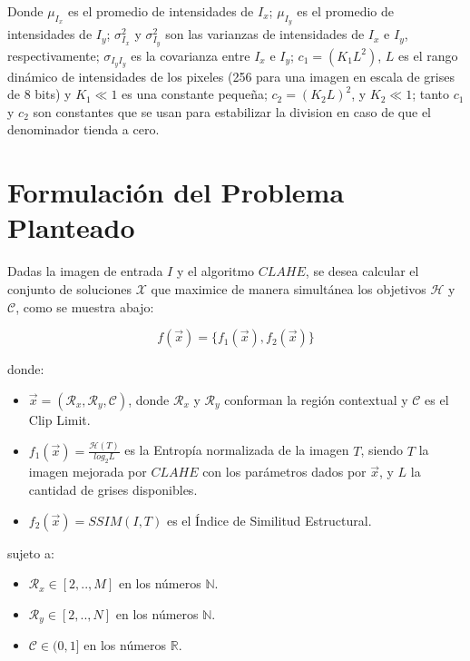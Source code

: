 \documentclass[spanish,twocolumn]{article}
\begin{document}
Donde $\mu_{I_x}$ es el promedio de intensidades de $I_x$; $\mu_{I_y}$ es el promedio de intensidades de $I_y$; $\sigma_{I_x}^2$ y $\sigma_{I_y}^2$ son las varianzas de intensidades de $I_x$ e $I_y$, respectivamente; $\sigma_{I_y I_y}$ es la covarianza entre $I_x$ e $I_y$; $c_1=(K_1L^2)$, $L$ es el rango dinámico de intensidades de los pixeles (256 para una imagen en escala de grises de 8 bits) y $K_1 \ll 1$ es una constante pequeña; $c_2=(K_2 L)^2$, y $K_2 \ll 1$; tanto $c_1$ y $c_2$ son constantes que se usan para estabilizar la division en caso de que el denominador tienda a cero.

\section{Formulación del Problema Planteado}
\label{sec:formulacion}

Dadas la imagen de entrada $I$ y el algoritmo $CLAHE$, se desea calcular el conjunto de soluciones $\mathscr{X}$ que maximice de manera simultánea los objetivos $\mathscr{H}$ y $\mathcal{C}$, como se muestra abajo:

\begin{equation}\label{eq:fitness}
    f(\overrightarrow{x}) = \{ f_1(\overrightarrow{x}), f_2(\overrightarrow{x}) \}
\end{equation}

donde:
\begin{itemize}
\item $\overrightarrow{x}=(\mathcal{R}_x, \mathcal{R}_y, \mathcal{C})$, donde $\mathcal{R}_x$ y $\mathcal{R}_y$ conforman la región contextual y $\mathscr{C}$ es el Clip Limit.
\item $f_{1}(\overrightarrow{x})=\frac{\mathscr{H}(T)}{log_{2}L}$ es la Entropía normalizada de la imagen $T$, siendo $T$ la imagen mejorada por $CLAHE$ con los parámetros dados por $\overrightarrow{x}$, y $L$ la cantidad de grises disponibles.
\item $f_{2}(\overrightarrow{x})=SSIM(I,T)$ es el Índice de Similitud Estructural.
\end{itemize}

sujeto a:

\begin{itemize}
\item $\mathcal{R}_x \in [2,..,M]$ en los números $\mathbb{N}$.
\item $\mathcal{R}_y \in [2,..,N]$ en los números $\mathbb{N}$.
\item $\mathscr{C} \in (0,1]$ en los números $\mathbb{R}$.
\end{itemize}
\end{document}
